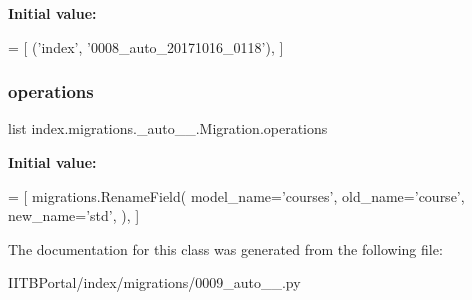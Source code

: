 {\bfseries Initial value\+:}
\begin{DoxyCode}
=  [
        (\textcolor{stringliteral}{'index'}, \textcolor{stringliteral}{'0008\_auto\_20171016\_0118'}),
    ]
\end{DoxyCode}
\mbox{\label{classindex_1_1migrations_1_10009__auto__20171016__0127_1_1Migration_ab392a6bcabd6674dd7dd042c0cfe10d4}} 
\subsubsection{\texorpdfstring{operations}{operations}}
{\footnotesize\ttfamily list index.\+migrations.\+\_\+auto\+\_\+\_.\+Migration.\+operations\hspace{0.3cm}{\ttfamily [static]}}

{\bfseries Initial value\+:}
\begin{DoxyCode}
=  [
        migrations.RenameField(
            model\_name=\textcolor{stringliteral}{'courses'},
            old\_name=\textcolor{stringliteral}{'course'},
            new\_name=\textcolor{stringliteral}{'std'},
        ),
    ]
\end{DoxyCode}


The documentation for this class was generated from the following file\+:\begin{DoxyCompactItemize}
\item 
I\+I\+T\+B\+Portal/index/migrations/0009\+\_\+auto\+\_\+\_.\+py\end{DoxyCompactItemize}
